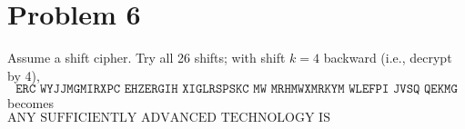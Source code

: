 \section*{Problem 6}

Assume a shift cipher. Try all 26 shifts; with shift \(k=4\) backward (i.e., decrypt by 4),
\[
\texttt{ERC WYJJMGMIRXPC EHZERGIH XIGLRSPSKC MW MRHMWXMRKYM WLEFPI JVSQ QEKMG}
\]
becomes
\[
\boxed{\text{ANY SUFFICIENTLY ADVANCED TECHNOLOGY IS INDISTINGUISHABLE FROM MAGIC.}}
\]
